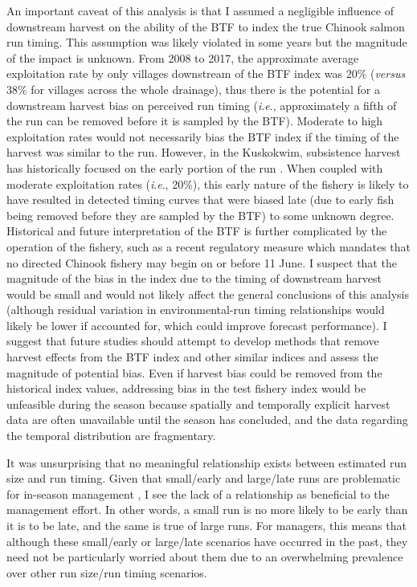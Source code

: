 \documentclass[12pt,]{book}
\theoremstyle{definition}
\theoremstyle{definition}
\theoremstyle{definition}
\theoremstyle{remark}
\begin{document}
An important caveat of this analysis is that I assumed a negligible
influence of downstream harvest on the ability of the BTF to index the
true Chinook salmon run timing. This assumption was likely violated in
some years but the magnitude of the impact is unknown. From 2008 to
2017, the approximate average exploitation rate by only villages
downstream of the BTF index was 20\% (\emph{versus} 38\% for villages
across the whole drainage), thus there is the potential for a downstream
harvest bias on perceived run timing (\emph{i}.\emph{e}., approximately
a fifth of the run can be removed before it is sampled by the BTF).
Moderate to high exploitation rates would not necessarily bias the BTF
index if the timing of the harvest was similar to the run. However, in
the Kuskokwim, subsistence harvest has historically focused on the early
portion of the run \citep{hamazaki-2008}. When coupled with moderate
exploitation rates (\emph{i}.\emph{e}., 20\%), this early nature of the
fishery is likely to have resulted in detected timing curves that were
biased late (due to early fish being removed before they are sampled by
the BTF) to some unknown degree. Historical and future interpretation of
the BTF is further complicated by the operation of the fishery, such as
a recent regulatory measure which mandates that no directed Chinook
fishery may begin on or before 11 June. I suspect that the magnitude of
the bias in the index due to the timing of downstream harvest would be
small and would not likely affect the general conclusions of this
analysis (although residual variation in environmental-run timing
relationships would likely be lower if accounted for, which could
improve forecast performance). I suggest that future studies should
attempt to develop methods that remove harvest effects from the BTF
index and other similar indices and assess the magnitude of potential
bias. Even if harvest bias could be removed from the historical index
values, addressing bias in the test fishery index would be unfeasible
during the season because spatially and temporally explicit harvest data
are often unavailable until the season has concluded, and the data
regarding the temporal distribution are fragmentary.

It was unsurprising that no meaningful relationship exists between
estimated run size and run timing. Given that small/early and large/late
runs are problematic for in-season management
\citep{adkison-cunningham-2015}, I see the lack of a relationship as
beneficial to the management effort. In other words, a small run is no
more likely to be early than it is to be late, and the same is true of
large runs. For managers, this means that although these small/early or
large/late scenarios have occurred in the past, they need not be
particularly worried about them due to an overwhelming prevalence over
other run size/run timing scenarios.
\end{document}
